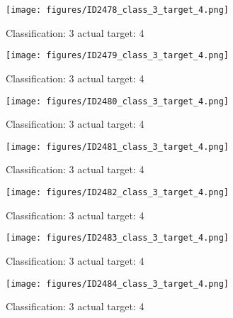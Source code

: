 \begin{figure}[h!]
\begin{center}
\texttt{[image: figures/ID2478\_class\_3\_target\_4.png]}
\end{center}
\caption{ Classification: 3 actual target: 4}
\label{fig:ID2478_class_3_target_4}
\end{figure}
\begin{figure}[h!]
\begin{center}
\texttt{[image: figures/ID2479\_class\_3\_target\_4.png]}
\end{center}
\caption{ Classification: 3 actual target: 4}
\label{fig:ID2479_class_3_target_4}
\end{figure}
\begin{figure}[h!]
\begin{center}
\texttt{[image: figures/ID2480\_class\_3\_target\_4.png]}
\end{center}
\caption{ Classification: 3 actual target: 4}
\label{fig:ID2480_class_3_target_4}
\end{figure}
\begin{figure}[h!]
\begin{center}
\texttt{[image: figures/ID2481\_class\_3\_target\_4.png]}
\end{center}
\caption{ Classification: 3 actual target: 4}
\label{fig:ID2481_class_3_target_4}
\end{figure}
\begin{figure}[h!]
\begin{center}
\texttt{[image: figures/ID2482\_class\_3\_target\_4.png]}
\end{center}
\caption{ Classification: 3 actual target: 4}
\label{fig:ID2482_class_3_target_4}
\end{figure}
\begin{figure}[h!]
\begin{center}
\texttt{[image: figures/ID2483\_class\_3\_target\_4.png]}
\end{center}
\caption{ Classification: 3 actual target: 4}
\label{fig:ID2483_class_3_target_4}
\end{figure}
\begin{figure}[h!]
\begin{center}
\texttt{[image: figures/ID2484\_class\_3\_target\_4.png]}
\end{center}
\caption{ Classification: 3 actual target: 4}
\label{fig:ID2484_class_3_target_4}
\end{figure}
